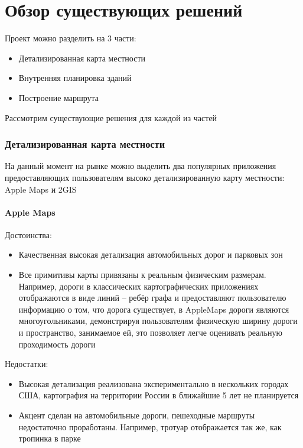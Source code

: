   \section{Обзор существующих решений}
    Проект можно разделить на 3 части:
    \begin{itemize}
      \item Детализированная карта местности
      \item Внутренняя планировка зданий
      \item Построение маршрута
    \end{itemize}


    Рассмотрим существующие решения для каждой из частей

    \subsubsection{Детализированная карта местности}
      На данный момент на рынке можно выделить два популярных приложения предоставляющих пользователям высоко детализированную карту местности: Apple Maps и 2GIS
      \paragraph{Apple Maps}
        \noindent Достоинства:
        \begin{itemize}
          \item Качественная высокая детализация автомобильных дорог и парковых зон
          \item Все примитивы карты привязаны к реальным физическим размерам. Например, дороги в классических картографических приложениях отображаются в виде линий -- ребёр графа и предоставляют пользователю информацию о том, что дорога существует, в AppleMaps дороги являются многоугольниками, демонстрируя пользователям физическую ширину дороги и пространство, занимаемое ей, это позволяет легче оценивать реальную проходимость дороги
        \end{itemize}

        \noindent Недостатки:
        \begin{itemize}
          \item Высокая детализация реализована экспериментально в нескольких городах США, картография на территории России в ближайшие 5 лет не планируется
          \item Акцент сделан на автомобильные дороги, пешеходные маршруты недостаточно проработаны. Например, тротуар отображается так же, как тропинка в парке
        \end{itemize}

